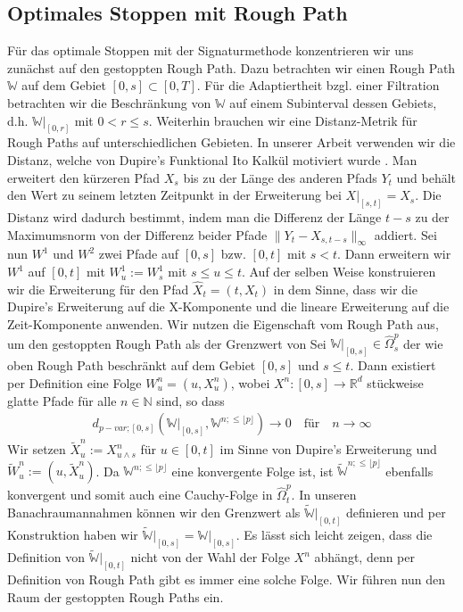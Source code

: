 \documentclass[12pt,titlepage,headsepline]{article}
\begin{document}
      \subsection{Optimales Stoppen mit Rough Path}\label{stopped_rough_path: chapter}
      Für das optimale Stoppen mit der Signaturmethode konzentrieren wir uns zunächst auf den gestoppten Rough Path. Dazu betrachten wir einen Rough Path $\mathbb{W}$ auf dem Gebiet $[0,s] \subset [0,T]$. Für die Adaptiertheit bzgl. einer Filtration betrachten wir die Beschränkung von $\mathbb{W}$ auf einem Subinterval dessen Gebiets, d.h. $\mathbb{W}\rvert_{[0,r]}$ mit $0<r\leq s$. Weiterhin brauchen wir eine Distanz-Metrik für Rough Paths auf unterschiedlichen Gebieten. In unserer Arbeit verwenden wir die Distanz, welche von Dupire's Funktional Ito Kalkül motiviert wurde \cite{cont_functional_2010, dupire_functional_2009}. Man erweitert den kürzeren Pfad $X_s$ bis zu der Länge des anderen Pfads $Y_t$ und behält den Wert zu seinem letzten Zeitpunkt in der Erweiterung bei $X\rvert_{[s,t]}=X_s$. Die Distanz wird dadurch bestimmt, indem man die Differenz der Länge $t-s$ zu der Maximumsnorm von der Differenz beider Pfade $\lVert Y_t - X_{s,t-s}\rVert_{\infty}$ addiert.
      \hfill\break
      Sei nun $W^1$ und $W^2$ zwei Pfade auf $[0,s]$ bzw. $[0,t]$ mit $s<t$. Dann erweitern wir $W^1$ auf $[0,t]$
      mit $W^1_u:=W^1_s$ mit $s \leq u \leq t $. Auf der selben Weise konstruieren wir die Erweiterung für den Pfad $\hat{X}_t = (t,X_t)$ in dem Sinne, dass wir die Dupire's Erweiterung auf die X-Komponente und die lineare Erweiterung auf die Zeit-Komponente anwenden.
      \hfill\break
      Wir nutzen die Eigenschaft vom Rough Path aus, um den gestoppten Rough Path als der Grenzwert von Sei $\mathbb{W}\rvert_{[0,s]} \in \hat{\Omega}_s^p$ der wie oben Rough Path beschränkt auf dem Gebiet $[0,s]$ und $s \leq t$. Dann existiert per Definition eine Folge $W_u^n =(u,X_u^n)$, wobei $X^n:[0,s] \rightarrow \mathbb{R}^d$ stückweise glatte Pfade für alle $n \in \mathbb{N}$ sind, so dass
      \begin{align*}
        d_{p-var;[0,s]}(\mathbb{W}\rvert_{[0,s]},\mathbb{W}^{n;\leq \lfloor p\rfloor}) \rightarrow 0 \quad \text{für} \quad n \rightarrow \infty
      \end{align*}
      Wir setzen $\tilde{X}_u^n:=X^n_{u \wedge s}$ für $u \in [0,t]$ im Sinne von Dupire's Erweiterung und $\tilde{W}_u^n:=(u,\tilde{X}_u^n)$. Da $\mathbb{W}^{n;\leq \lfloor p\rfloor} $ eine konvergente Folge ist, ist $\tilde{\mathbb{W}}^{n;\leq \lfloor p\rfloor} $ ebenfalls konvergent und somit auch eine Cauchy-Folge in $\hat{\Omega}_t^p$. In unseren Banachraumannahmen können wir den Grenzwert als $\tilde{\mathbb{W}}\rvert_{[0,t]}$ definieren und per Konstruktion haben wir $\tilde{\mathbb{W}}\rvert_{[0,s]}=\mathbb{W}\rvert_{[0,s]}$. Es lässt sich leicht zeigen, dass die Definition von $\tilde{\mathbb{W}}\rvert_{[0,t]}$ nicht von der Wahl der Folge $X^n$ abhängt, denn per Definition von Rough Path gibt es immer eine solche Folge. Wir führen nun den Raum der gestoppten Rough Paths ein.
\end{document}
